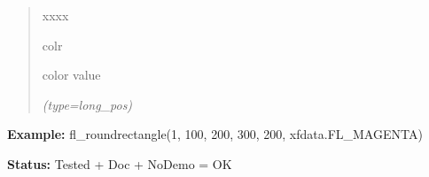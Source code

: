 \begin{boxedminipage}{\funcwidth}
\begin{quote}
\begin{Ventry}{xxxx}
          \item[colr]

          color value

            {\it (type=long\_pos)}

        \end{Ventry}

      \end{quote}

\textbf{Example:} fl\_roundrectangle(1, 100, 200, 300, 200, xfdata.FL\_MAGENTA)



\textbf{Status:} Tested + Doc + NoDemo = OK



    \end{boxedminipage}

    \label{xformslib:flxbasic:fl_roundrectf}

    \vspace{0.5ex}


